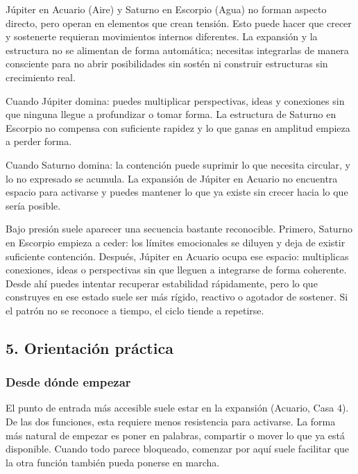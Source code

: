 \documentclass[11pt,a4paper]{article}
\begin{document}
Júpiter en Acuario (Aire) y Saturno en Escorpio (Agua) no forman aspecto directo, pero operan en elementos que crean tensión. Esto puede hacer que crecer y sostenerte requieran movimientos internos diferentes. La expansión y la estructura no se alimentan de forma automática; necesitas integrarlas de manera consciente para no abrir posibilidades sin sostén ni construir estructuras sin crecimiento real.

Cuando Júpiter domina: puedes multiplicar perspectivas, ideas y conexiones sin que ninguna llegue a profundizar o tomar forma. La estructura de Saturno en Escorpio no compensa con suficiente rapidez y lo que ganas en amplitud empieza a perder forma.

Cuando Saturno domina: la contención puede suprimir lo que necesita circular, y lo no expresado se acumula. La expansión de Júpiter en Acuario no encuentra espacio para activarse y puedes mantener lo que ya existe sin crecer hacia lo que sería posible.

Bajo presión suele aparecer una secuencia bastante reconocible. Primero, Saturno en Escorpio empieza a ceder: los límites emocionales se diluyen y deja de existir suficiente contención. Después, Júpiter en Acuario ocupa ese espacio: multiplicas conexiones, ideas o perspectivas sin que lleguen a integrarse de forma coherente. Desde ahí puedes intentar recuperar estabilidad rápidamente, pero lo que construyes en ese estado suele ser más rígido, reactivo o agotador de sostener. Si el patrón no se reconoce a tiempo, el ciclo tiende a repetirse.

\vspace{0.8cm}


\subsection{5. Orientación práctica}

\subsubsection*{Desde dónde empezar}

El punto de entrada más accesible suele estar en la expansión (Acuario, Casa 4). De las dos funciones, esta requiere menos resistencia para activarse. La forma más natural de empezar es poner en palabras, compartir o mover lo que ya está disponible. Cuando todo parece bloqueado, comenzar por aquí suele facilitar que la otra función también pueda ponerse en marcha.
\end{document}
